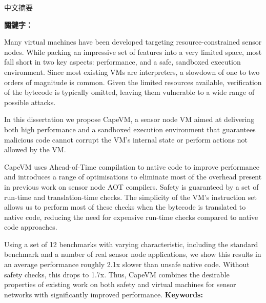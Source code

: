 \begin{abstractzh}
中文摘要

\bigbreak
\noindent \textbf{關鍵字：}{\, \makeatletter \@keywordszh \makeatother}
\end{abstractzh}

\begin{abstracten}
Many virtual machines have been developed targeting resource-constrained sensor nodes. While packing an impressive set of features into a very limited space, most fall short in two key aspects: performance, and a safe, sandboxed execution environment. Since most existing VMs are interpreters, a slowdown of one to two orders of magnitude is common. Given the limited resources available, verification of the bytecode is typically omitted, leaving them vulnerable to a wide range of possible attacks.

In this dissertation we propose CapeVM, a sensor node VM aimed at delivering both high performance and a sandboxed execution environment that guarantees malicious code cannot corrupt the VM's internal state or perform actions not allowed by the VM.

CapeVM uses Ahead-of-Time compilation to native code to improve performance and introduces a range of optimisations to eliminate most of the overhead present in previous work on sensor node AOT compilers. Safety is guaranteed by a set of run-time and translation-time checks. The simplicity of the VM's instruction set allows us to perform most of these checks when the bytecode is translated to native code, reducing the need for expensive run-time checks compared to native code approaches.

Using a set of 12 benchmarks with varying characteristic, including the standard  benchmark and a number of real sensor node applications, we show this results in an average performance roughly 2.1x slower than unsafe native code. Without safety checks, this drops to 1.7x. Thus, CapeVM combines the desirable properties of existing work on both safety and virtual machines for sensor networks with significantly improved performance.
\bigbreak
\noindent \textbf{Keywords: }{\, \makeatletter \@keywordsen \makeatother}
\end{abstracten}

\begin{comment}


\end{comment}
